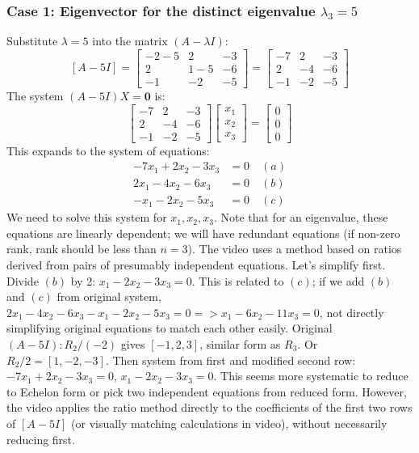\documentclass{article}
\begin{document}
\subsubsection*{Case 1: Eigenvector for the distinct eigenvalue $\lambda_3 = 5$}
Substitute $\lambda = 5$ into the matrix $(A - \lambda I)$:
\[ [A - 5I] = \begin{bmatrix} -2 - 5 & 2 & -3 \\ 2 & 1 - 5 & -6 \\ -1 & -2 & -5 \end{bmatrix} = \begin{bmatrix} -7 & 2 & -3 \\ 2 & -4 & -6 \\ -1 & -2 & -5 \end{bmatrix} \]
The system $(A - 5I)X = \mathbf{0}$ is:
\[ \begin{bmatrix} -7 & 2 & -3 \\ 2 & -4 & -6 \\ -1 & -2 & -5 \end{bmatrix} \begin{bmatrix} x_1 \\ x_2 \\ x_3 \end{bmatrix} = \begin{bmatrix} 0 \\ 0 \\ 0 \end{bmatrix} \]
This expands to the system of equations:
\begin{align*} -7x_1 + 2x_2 - 3x_3 &= 0 \quad (a) \\ 2x_1 - 4x_2 - 6x_3 &= 0 \quad (b) \\ -x_1 - 2x_2 - 5x_3 &= 0 \quad (c) \end{align*}
We need to solve this system for $x_1, x_2, x_3$. Note that for an eigenvalue, these equations are linearly dependent; we will have redundant equations (if non-zero rank, rank should be less than $n=3$). The video uses a method based on ratios derived from pairs of presumably independent equations. Let's simplify first. Divide $(b)$ by 2: $x_1 - 2x_2 - 3x_3 = 0$. This is related to $(c)$; if we add $(b)$ and $(c)$ from original system, $2x_1-4x_2-6x_3 -x_1-2x_2-5x_3=0 => x_1 - 6x_2 - 11x_3=0$, not directly simplifying original equations to match each other easily. Original $(A-5I): R_2/(-2)$ gives $[-1, 2, 3]$, similar form as $R_3$. Or $R_2/2 = [1, -2, -3]$. Then system from first and modified second row: $-7x_1+2x_2-3x_3=0$, $x_1 - 2x_2 - 3x_3=0$. This seems more systematic to reduce to Echelon form or pick two independent equations from reduced form. However, the video applies the ratio method directly to the coefficients of the first two rows of $[A-5I]$ (or visually matching calculations in video), without necessarily reducing first.
\end{document}
